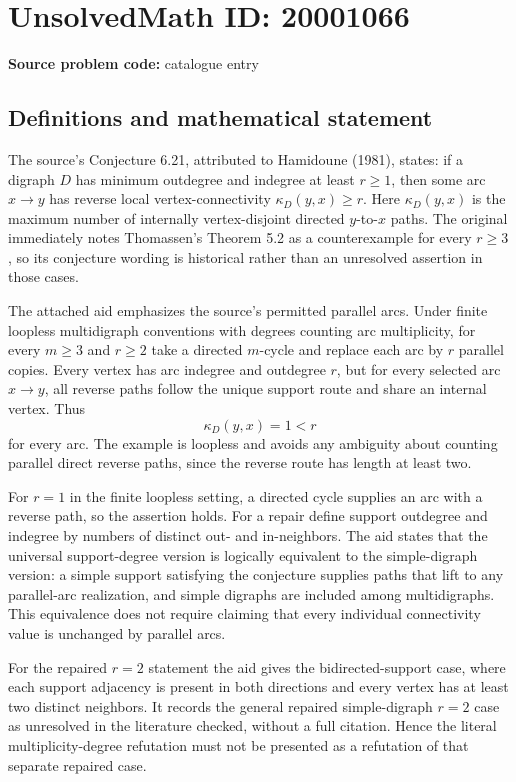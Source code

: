 \documentclass[11pt]{article}
\begin{document}
\section*{UnsolvedMath ID: 20001066}
\textbf{Source problem code:} catalogue entry
\subsection{Definitions and mathematical statement}
The source's Conjecture 6.21, attributed to Hamidoune (1981), states: if a digraph $D$ has minimum outdegree and indegree at least $r\ge1$, then some arc $x\to y$ has reverse local vertex-connectivity $\kappa_D(y,x)\ge r$. Here $\kappa_D(y,x)$ is the maximum number of internally vertex-disjoint directed $y$-to-$x$ paths. The original immediately notes Thomassen's Theorem 5.2 as a counterexample for every $r\ge3$, so its conjecture wording is historical rather than an unresolved assertion in those cases.

The attached aid emphasizes the source's permitted parallel arcs. Under finite loopless multidigraph conventions with degrees counting arc multiplicity, for every $m\ge3$ and $r\ge2$ take a directed $m$-cycle and replace each arc by $r$ parallel copies. Every vertex has arc indegree and outdegree $r$, but for every selected arc $x\to y$, all reverse paths follow the unique support route and share an internal vertex. Thus
\[
\kappa_D(y,x)=1<r
\]
for every arc. The example is loopless and avoids any ambiguity about counting parallel direct reverse paths, since the reverse route has length at least two.

For $r=1$ in the finite loopless setting, a directed cycle supplies an arc with a reverse path, so the assertion holds. For a repair define support outdegree and indegree by numbers of distinct out- and in-neighbors. The aid states that the universal support-degree version is logically equivalent to the simple-digraph version: a simple support satisfying the conjecture supplies paths that lift to any parallel-arc realization, and simple digraphs are included among multidigraphs. This equivalence does not require claiming that every individual connectivity value is unchanged by parallel arcs.

For the repaired $r=2$ statement the aid gives the bidirected-support case, where each support adjacency is present in both directions and every vertex has at least two distinct neighbors. It records the general repaired simple-digraph $r=2$ case as unresolved in the literature checked, without a full citation. Hence the literal multiplicity-degree refutation must not be presented as a refutation of that separate repaired case.
\end{document}
